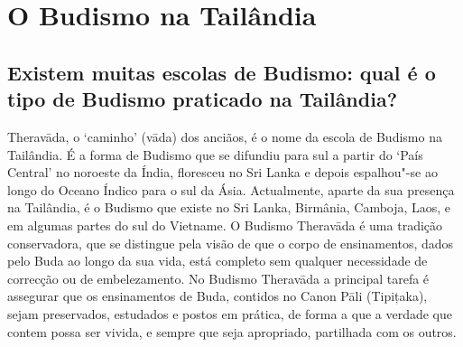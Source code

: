 

\setlength{\chapterTitleTopSkip}{60mm}


\enlargethispage{2\baselineskip}

\chapter{O Budismo na Tailândia}

\section{Existem muitas escolas de Budismo: qual é o tipo de Budismo praticado
  na Tailândia?}

Theravāda, o `caminho' (vāda) dos anciãos, é o nome da escola de
Budismo na Tailândia. É a forma de Budismo que se difundiu para sul a
partir do `País Central' no noroeste da Índia, floresceu no Sri Lanka
e depois espalhou"-se ao longo do Oceano Índico para o sul da Ásia.
Actualmente, aparte da sua presença na Tailândia, é o Budismo que existe
no Sri Lanka, Birmânia, Camboja, Laos, e em algumas partes do sul do Vietname.
O Budismo Theravāda é uma tradição conservadora, que se distingue
pela visão de que o corpo de ensinamentos, dados pelo Buda ao longo da
sua vida, está completo sem qualquer necessidade de correcção ou de
embelezamento. No Budismo Theravāda a principal tarefa é assegurar que
os ensinamentos de Buda, contidos no Canon Pāli (Tipițaka), sejam
preservados, estudados e postos em prática, de forma a que a verdade que
contem possa ser vivida, e sempre que seja apropriado, partilhada com os
outros.

